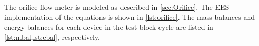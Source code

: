 The orifice flow meter is modeled as described in \cref{sec:Orifice}. The EES
implementation of the equations is shown in \cref{lst:orifice}.
%
The mass balances and energy balances for each device in the test block cycle
are listed in \cref{lst:mbal,lst:ebal}, respectively.
%
%